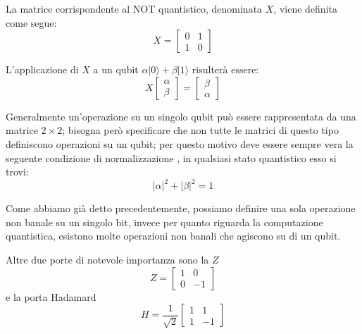 La matrice corrispondente al NOT quantistico, denominata $X$, viene definita come segue:
\begin{equation}
    X=
    \begin{bmatrix}
        0 & 1\\
        1 & 0
    \end{bmatrix}
\end{equation}

L'applicazione di $X$ a un qubit $\alpha|0\rangle + \beta|1\rangle$ risulterà essere:
\begin{equation}
    X
    \begin{bmatrix}
        \alpha \\
        \beta
    \end{bmatrix} =
    \begin{bmatrix}
        \beta \\
        \alpha
    \end{bmatrix}
\end{equation}

Generalmente un'operazione su un singolo qubit può essere rappresentata da una matrice $2\times2$; bisogna però specificare che non tutte le matrici di questo tipo definiscono operazioni  su un qubit; per questo motivo deve essere sempre vera la seguente condizione di normalizzazione \cite{zhao2020articolo}, in qualsiasi stato quantistico esso si trovi:
\begin{equation}
    |\alpha|^2 + |\beta|^2 = 1
\end{equation}

Come abbiamo già detto precedentemente, possiamo definire una sola operazione non banale su un singolo bit, invece per quanto riguarda la computazione quantistica, esistono molte operazioni non banali che agiscono su di un qubit.

Altre due porte di notevole importanza sono la $Z$
\begin{equation}
    Z=
    \begin{bmatrix}
        1 & 0\\
        0 & -1
    \end{bmatrix}
\end{equation}
e la porta Hadamard
\begin{equation}
    H=
    \dfrac{1}{\sqrt{2}}
    \begin{bmatrix}
        1 & 1\\
        1 & -1
    \end{bmatrix}
\end{equation}

